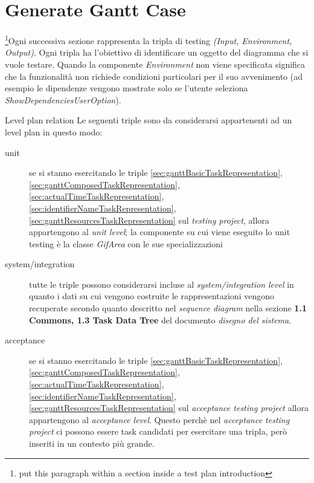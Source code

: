 \chapter{Generate Gantt Case}
\label{chap:generateGantt}

\footnote{put this paragraph within a section inside a test plan
introduction}Ogni successiva sezione rappresenta la tripla di testing
\emph{(Input, Environment, Output)}. Ogni tripla ha l'obiettivo di identificare un oggetto del diagramma che si vuole testare. Quando la componente \emph{Environment} non
viene specificata significa che la funzionalit\`a non richiede condizioni
particolari per il suo avvenimento (ad esempio le dipendenze vengono mostrate
solo se l'utente seleziona \emph{ShowDependenciesUserOption}).

\begin{paragraph}{Level plan relation}
Le seguenti triple sono da considerarsi appartenenti ad un level plan in questo
modo:
\begin{description}
\item[unit] se si stanno esercitando le triple
\ref{sec:ganttBasicTaskRepresentation},  \ref{sec:ganttComposedTaskRepresentation}, \ref{sec:actualTimeTaskRepresentation},
\ref{sec:identifierNameTaskRepresentation},
\ref{sec:ganttResourcesTaskRepresentation} sul \emph{testing project}, allora
appartengono al \emph{unit level}; la componente su cui viene eseguito lo unit testing
  \`e la classe \emph{GifArea} con le sue specializzazioni
  \item[system/integration] tutte le triple possono considerarsi incluse al
  \emph{system/integration level} in quanto i dati su cui vengono costruite le
  rappresentazioni vengono recuperate secondo quanto descritto nel
  \emph{sequence diagram} nella sezione \textbf{1.1 Commons, 1.3 Task Data Tree} del documento
  \emph{disegno del sistema}.
  \item[acceptance] se si stanno esercitando le triple
\ref{sec:ganttBasicTaskRepresentation},  \ref{sec:ganttComposedTaskRepresentation}, \ref{sec:actualTimeTaskRepresentation},
\ref{sec:identifierNameTaskRepresentation},
\ref{sec:ganttResourcesTaskRepresentation} sul \emph{acceptance testing project}
  allora appartengono al \emph{acceptance level}. Questo perch\`e nel
  \emph{acceptance testing project} ci possono essere task candidati per
  esercitare una tripla, per\`o inseriti in un contesto pi\`u grande.
\end{description}
\end{paragraph}

